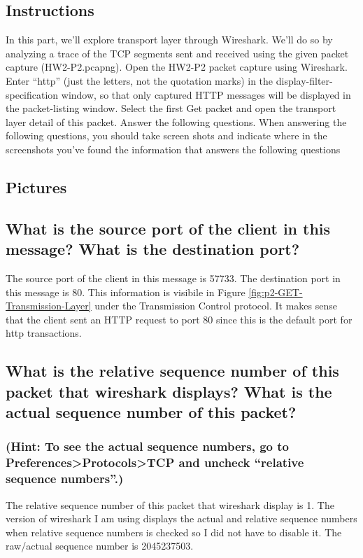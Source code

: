\documentclass{assignment-x}
\begin{document}
\subsection{Instructions}
In this part, we'll explore transport layer through Wireshark. We'll do so by analyzing a trace of
the TCP segments sent and received using the given packet capture (HW2-P2.pcapng).
Open the HW2-P2 packet capture using Wireshark.
Enter “http” (just the letters, not the quotation marks) in the display-filter-specification
window, so that only captured HTTP messages will be displayed in the packet-listing
window.
Select the first Get packet and open the transport layer detail of this packet.
Answer the following questions. When answering the following questions, you should take
screen shots and indicate where in the screenshots you've found the information that
answers the following questions

\subsection{Pictures}

\subsection{What is the source port of the client in this message? What is the destination port?}
The source port of the client in this message is 57733. The destination port in this message is 80. This information is visibile in Figure \ref{fig:p2-GET-Transmission-Layer} under the Transmission Control protocol. It makes sense that the client sent an HTTP request to port 80 since this is the default port for http transactions.

\subsection{What is the relative sequence number of this packet that wireshark displays? What is the
actual sequence number of this packet? }
\subsubsection{(Hint: To see the actual sequence numbers, go to Preferences>Protocols>TCP and uncheck “relative sequence numbers”.)}
The relative sequence number of this packet that wireshark display is 1. The version of wireshark I am using displays the actual and relative sequence numbers when relative sequence numbers is checked so I did not have to disable it. The raw/actual sequence number is 2045237503.
\end{document}

